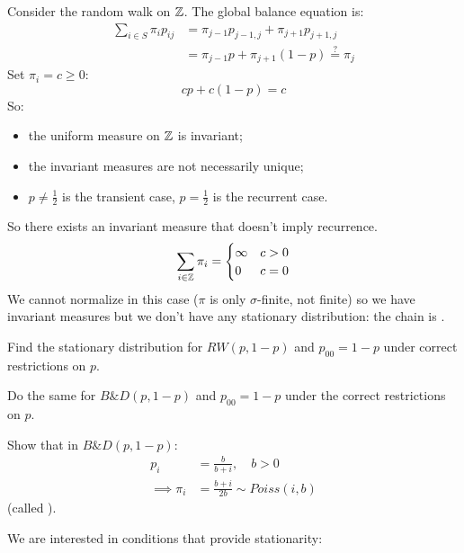 \documentclass{article}
\begin{document}
	\begin{example}
		Consider the random walk on $\mathbb{Z}$. The global balance equation is:
		\begin{align*}
			\sum_{i \in S} \pi_i p_{ij}&=\pi_{j-1}p_{j-1,j}+\pi_{j+1}p_{j+1,j}\\
			&=\pi_{j-1}p+\pi_{j+1}(1-p)\stackrel{?}{=}\pi_j
		\end{align*}
		Set $\pi_i=c\geqslant0$:
		\[cp+c(1-p)=c\]
		So:\begin{itemize}
			\item the uniform measure on $\mathbb{Z}$ is invariant;
			\item the invariant measures are not necessarily unique;
			\item $p\neq\frac{1}{2}$ is the transient case, $p=\frac{1}{2}$ is the recurrent case.
		\end{itemize}
		So there exists an invariant measure that doesn't imply recurrence.
		\[
		\sum_{i\in\mathbb{Z}}\pi_i=\begin{cases}
			\infty &c>0\\
			0 &c=0
		\end{cases}
		\]
		We cannot normalize in this case ($\pi$ is only $\sigma$-finite, not finite) so we have invariant measures but we don't have any stationary distribution: the chain is .
	\end{example}
	\begin{exercise}
		Find the stationary distribution for $RW(p,1-p)$ and $p_{00}=1-p$ under correct restrictions on $p$.
	\end{exercise}
	\begin{exercise}
		Do the same for $B\&D(p,1-p)$ and $p_{00}=1-p$ under the correct restrictions on $p$.
	\end{exercise}
	\begin{exercise}
		Show that in $B\&D(p,1-p)$:
		\begin{align*}
			p_i&=\frac{b}{b+i},\quad b>0\\
			\implies\pi_i&=\frac{b+i}{2b}\sim Poiss(i,b)
		\end{align*}
		(called ).
	\end{exercise}
	We are interested in conditions that provide stationarity:
	
\end{document}

